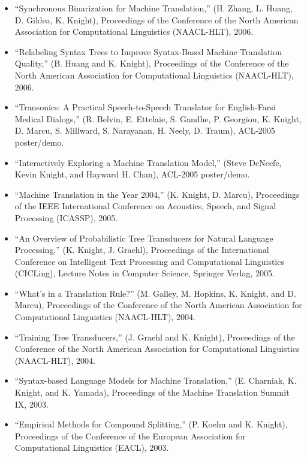 \begin{itemize}
\item ``Synchronous Binarization for Machine Translation,''
(H. Zhang, L. Huang, D. Gildea, K. Knight), 
Proceedings of the Conference of the 
North American Association for Computational Linguistics (NAACL-HLT), 
2006. 

\item ``Relabeling Syntax Trees to Improve Syntax-Based Machine
Translation Quality,''
(B. Huang and K. Knight), 
Proceedings of the Conference of the 
North American Association for Computational Linguistics (NAACL-HLT), 
2006.  

\item ``Transonics: A Practical Speech-to-Speech Translator for English-Farsi Medical Dialogs,'' (R. Belvin, E. Ettelaie, S. Gandhe, P. Georgiou, K. Knight, D. Marcu, S. Millward, S. Narayanan, H. Neely, D. Traum), ACL-2005 poster/demo.

\item ``Interactively Exploring a Machine Translation Model,''
(Steve DeNeefe, Kevin Knight, and Hayward H. Chan), ACL-2005 poster/demo.

\item ``Machine Translation in the Year 2004,'' (K. Knight, D. Marcu), 
Proceedings of the IEEE International Conference on Acoustics,
Speech, and Signal Processing (ICASSP), 2005. 

\item ``An Overview of Probabilistic Tree Transducers for 
Natural Language Processing,'' (K. Knight, J. Graehl), Proceedings of
the International Conference on Intelligent Text Processing 
and Computational Linguistics (CICLing), Lecture Notes in Computer 
Science, Springer Verlag, 2005.

\item ``What's in a Translation Rule?'' (M. Galley, M. Hopkins,
K. Knight, and D. Marcu), 
Proceedings of the Conference of the 
North American Association for Computational Linguistics (NAACL-HLT), 
2004.

\item ``Training Tree Transducers,'' (J. Graehl and K. Knight),
Proceedings of the Conference of the 
North American Association for Computational Linguistics (NAACL-HLT), 
2004.

\item ``Syntax-based Language Models for Machine Translation,''
(E. Charniak, K. Knight, and K. Yamada), Proceedings of the
Machine Translation Summit IX, 2003.

\item ``Empirical Methods for Compound Splitting,''
(P. Koehn and K. Knight),
Proceedings of the Conference of 
the European Association for Computational Linguistics (EACL), 2003. 


\end{itemize}
